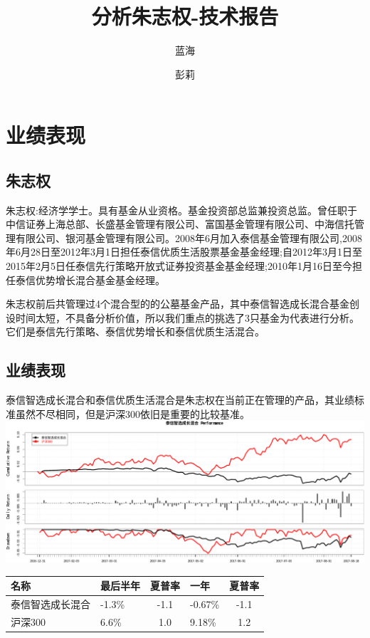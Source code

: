 \documentclass[hyperref,]{ctexart}
\title{分析朱志权-技术报告}
\author{蓝海 \and 彭莉}
\date{}
\begin{document}
\maketitle

{
\setcounter{tocdepth}{2}
\tableofcontents
}
\section{业绩表现}

\subsection{朱志权}

朱志权:经济学学士。具有基金从业资格。基金投资部总监兼投资总监。曾任职于中信证券上海总部、长盛基金管理有限公司、富国基金管理有限公司、中海信托管理有限公司、银河基金管理有限公司。2008年6月加入泰信基金管理有限公司,2008年6月28日至2012年3月1日担任泰信优质生活股票基金基金经理;自2012年3月1日至2015年2月5日任泰信先行策略开放式证券投资基金基金经理;2010年1月16日至今担任泰信优势增长混合基金基金经理。

朱志权前后共管理过4个混合型的的公墓基金产品，其中泰信智选成长混合基金创设时间太短，不具备分析价值，所以我们重点的挑选了3只基金为代表进行分析。它们是泰信先行策略、泰信优势增长和泰信优质生活混合。

\subsection{业绩表现}\label{-1}

泰信智选成长混合和泰信优质生活混合是朱志权在当前正在管理的产品，其业绩标准虽然不尽相同，但是沪深300依旧是重要的比较基准。
\includegraphics{zzq-detail_files/figure-latex/unnamed-chunk-2-1.pdf}

\begin{longtable}[]{@{}llclc@{}}
\toprule
名称 & 最后半年 & 夏普率 & 一年 & 夏普率\tabularnewline
\midrule
\endhead
泰信智选成长混合 & -1.3\% & -1.1 & -0.67\% & -1.1\tabularnewline
沪深300 & 6.6\% & 1.0 & 9.18\% & 1.2\tabularnewline
\bottomrule
\end{longtable}
\end{document}
